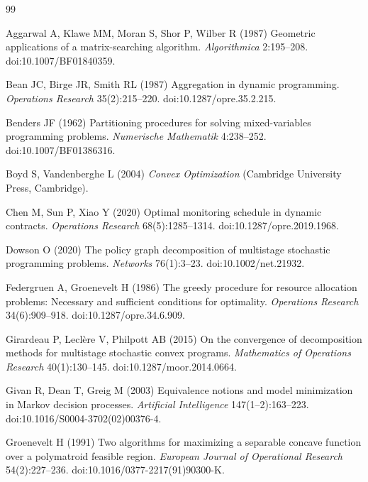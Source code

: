 \begin{thebibliography}{99}\raggedright
{}
Aggarwal A, Klawe MM, Moran S, Shor P, Wilber R (1987) Geometric applications of a matrix-searching algorithm. \emph{Algorithmica} 2:195--208. doi:10.1007/BF01840359.

Bean JC, Birge JR, Smith RL (1987) Aggregation in dynamic programming. \emph{Operations Research} 35(2):215--220. doi:10.1287/opre.35.2.215.

Benders JF (1962) Partitioning procedures for solving mixed-variables programming problems. \emph{Numerische Mathematik} 4:238--252. doi:10.1007/BF01386316.

Boyd S, Vandenberghe L (2004) \emph{Convex Optimization} (Cambridge University Press, Cambridge).

Chen M, Sun P, Xiao Y (2020) Optimal monitoring schedule in dynamic contracts. \emph{Operations Research} 68(5):1285--1314. doi:10.1287/opre.2019.1968.

Dowson O (2020) The policy graph decomposition of multistage stochastic programming problems. \emph{Networks} 76(1):3--23. doi:10.1002/net.21932.

Federgruen A, Groenevelt H (1986) The greedy procedure for resource allocation problems: Necessary and sufficient conditions for optimality. \emph{Operations Research} 34(6):909--918. doi:10.1287/opre.34.6.909.

Girardeau P, Lecl\`ere V, Philpott AB (2015) On the convergence of decomposition methods for multistage stochastic convex programs. \emph{Mathematics of Operations Research} 40(1):130--145. doi:10.1287/moor.2014.0664.

Givan R, Dean T, Greig M (2003) Equivalence notions and model minimization in Markov decision processes. \emph{Artificial Intelligence} 147(1--2):163--223. doi:10.1016/S0004-3702(02)00376-4.

Groenevelt H (1991) Two algorithms for maximizing a separable concave function over a polymatroid feasible region. \emph{European Journal of Operational Research} 54(2):227--236. doi:10.1016/0377-2217(91)90300-K.


\end{thebibliography}

